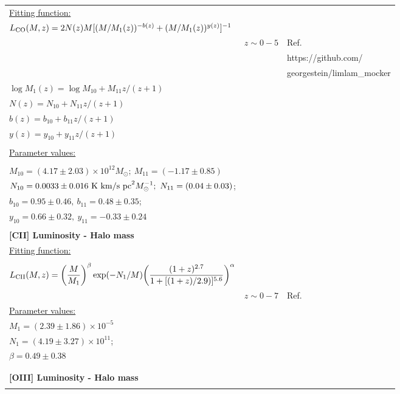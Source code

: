 \begin{longtable}{l|l|l}
      {\underline{Fitting function:}} &  & \\
     $L_{\rm CO} (M, z) = 2N(z) M [(M/M_1(z))^{-b(z)} + (M/M_1(z))^{y(z)}]^{-1}$ &  & \\
      & $z \sim 0-5$ & Ref. \cite{hpco} \\ 
       & & https://github.com/\\
      & & georgestein/limlam\_mocker  \\
     $\log M_1(z) = \log M_{10} + M_{11}z/(z + 1)$&& \\
$N(z) = N_{10} + N_{11}z/(z + 1)$&& \\
$b(z) = b_{10} + b_{11}z/(z + 1)$&& \\
$y(z) = y_{10} +  y_{11}z/(z + 1)$&& \\
& & \\
  {\underline{Parameter values:}} &  & \\
  &&\\
$M_{10}  = (4.17 \pm 2.03) \times 10^{12} M_{\odot}; \ M_{11} = (-1.17 \pm 0.85)$ &&\\
 $N_{10} = 0.0033 \pm 0.016 \ {\rm K \ km/s  \ pc}^2 M_{\odot}^{-1}; \ N_{11} = (0.04 \pm 0.03)$; && \\
 $b_{10} = 0.95 \pm 0.46, \  b_{11} = 0.48 \pm 0.35$; &&\\
 $y_{10} = 0.66 \pm 0.32, \  y_{11} = -0.33 \pm 0.24$ & & \\
 \hline
 & & \\
     {\large {\bf [CII] Luminosity - Halo mass} } &   &  \\
      {\underline{Fitting function:}} &  & \\
     && \\
     $L_{\rm CII}(M,z) = \displaystyle{\left(\frac{M}{M_1}\right)}^{\beta} \exp(-N_1/M) \displaystyle{\left(\frac{(1+z)^{2.7}}{1 + [(1+z)/2.9)]^{5.6}} \right)^{\alpha}} $ & & \\ 
      & $z \sim 0-7$ &  Ref. \cite{hpco} \\ 
  {\underline{Parameter values:}} &  & \\
$M_1 = (2.39 \pm 1.86) \times 10^{-5}$ &&\\
$N_1 = (4.19 \pm 3.27) \times 10^{11}$; && \\
 $\beta = 0.49 \pm 0.38$ &&\\
 &&\\
 \hline
 &&\\
    {\large {\bf [OIII] Luminosity - Halo mass}}  &   &  \\
    & & \\

\end{longtable}
